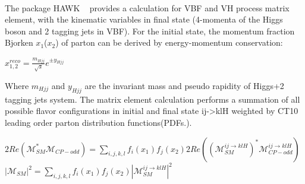 \paragraph{}The package HAWK ~\cite{HAWK_2015} provides a calculation for VBF and VH process matrix element, with the kinematic variables in final state (4-momenta of the Higgs boson and 2 tagging jets in VBF). For the initial state, the momentum fraction Bjorken $x_1$($x_2$) of parton can be derived by energy-momentum conservation: 

\begin{center}
\begin{math}
x_{1,2}^{reco}=\frac{m_{Hjj}}{\sqrt{s}}e^{\pm y_{Hjj}}
\end{math}
\end{center}

Where $m_{Hjj}$ and $y_{Hjj}$ are the invariant mass and pseudo rapidity of Higgs+2 tagging jets system. The matrix element calculation performs a summation of all possible flavor configurations in initial and final state ij->klH weighted by CT10 leading order parton distribution functions(PDFs.). 

\begin{center}
\begin{math}
2Re(\mathcal{M}^{\ast}_{SM}\mathcal{M}_{CP-odd}) = \sum_{i,j,k,l} f_i(x_1)f_j(x_2)2Re((\mathcal{M}_{SM}^{ij \to klH})^{\ast} \mathcal{M}_{CP-odd}^{ij\to klH} ) 
\end{math}
\\
\begin{math}
|\mathcal{M}_{SM}|^2 = \sum_{i,j,k,l} f_i(x_1)f_j(x_2)|\mathcal{M}_{SM}^{ij \to klH}|^2
\end{math}
\end{center}




